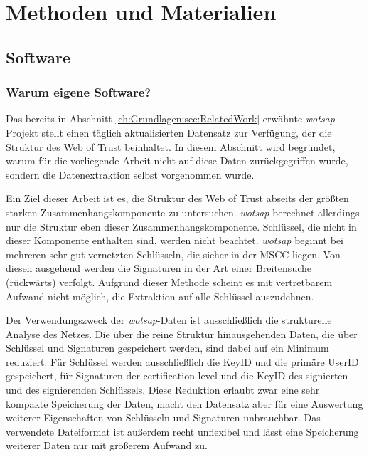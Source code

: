 
\chapter{Methoden und Materialien}
\label{ch:Methoden}

\section{Software}
\label{sec:software}


\subsection{Warum eigene Software?}
\label{ch:Grundlagen:sec:WarumEigene}
Das bereits in Abschnitt \ref{ch:Grundlagen:sec:RelatedWork} erwähnte
\emph{wotsap}-Projekt stellt einen täglich aktualisierten Datensatz
zur Verfügung, der die Struktur des Web of Trust beinhaltet. In
diesem Abschnitt wird begründet, warum für die vorliegende Arbeit
nicht auf diese Daten zurückgegriffen wurde, sondern die
Datenextraktion selbst vorgenommen wurde.

Ein Ziel dieser Arbeit ist es, die Struktur des Web of Trust abseits
der größten starken Zusammenhangskomponente zu
untersuchen. \emph{wotsap} berechnet allerdings nur die Struktur eben
dieser Zusammenhangskomponente. Schlüssel, die nicht in dieser
Komponente enthalten sind, werden nicht beachtet. \emph{wotsap}
beginnt bei mehreren sehr gut vernetzten Schlüsseln, die sicher in der
MSCC liegen. Von diesen ausgehend werden die Signaturen in der Art
einer Breitensuche (rückwärts) verfolgt. Aufgrund dieser Methode
scheint es mit vertretbarem Aufwand nicht möglich, die Extraktion auf
alle Schlüssel auszudehnen.

Der Verwendungszweck der \emph{wotsap}-Daten ist ausschließlich die
strukturelle Analyse des Netzes. Die über die reine Struktur
hinausgehenden Daten, die über Schlüssel und Signaturen gespeichert
werden, sind dabei auf ein Minimum reduziert: Für Schlüssel werden
ausschließlich die KeyID und die primäre UserID gespeichert, für
Signaturen der certification level und die KeyID des signierten und
des signierenden Schlüssels. Diese Reduktion erlaubt zwar eine sehr
kompakte Speicherung der Daten, macht den Datensatz aber für eine
Auswertung weiterer Eigenschaften von Schlüsseln und Signaturen
unbrauchbar. Das verwendete Dateiformat ist außerdem recht unflexibel
und lässt eine Speicherung weiterer Daten nur mit größerem Aufwand
zu.

